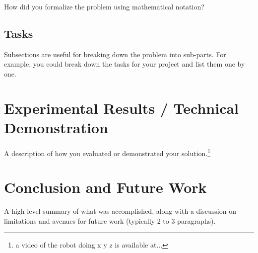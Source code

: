 \documentclass{article}
\begin{document}
How did you formalize the problem using mathematical notation?

\subsection{Tasks}

Subsections are useful for breaking down the problem into sub-parts. For example, you could break down the tasks for your project and list them one by one. 

\section{Experimental Results / Technical Demonstration}

A description of how you evaluated or demonstrated your solution.\footnote{a video of the robot doing x y z is available at...} 



\section{Conclusion and Future Work}

A high level summary of what was accomplished, along with a discussion on limitations and avenues for future work (typically 2 to 3 paragraphs). 






\end{document}
